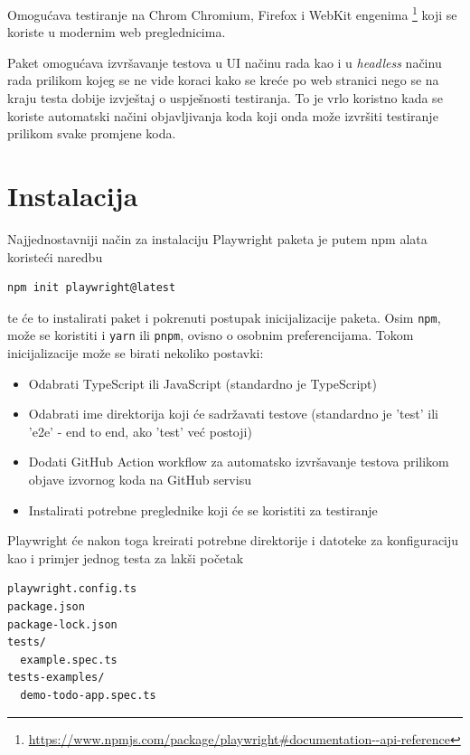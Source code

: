 Omogućava testiranje na Chrom Chromium, Firefox i WebKit engenima \footnote{\url{https://www.npmjs.com/package/playwright\#documentation--api-reference}} koji se koriste u modernim web preglednicima.

Paket omogućava izvršavanje testova u UI načinu rada kao i u \emph{headless} načinu rada prilikom kojeg se ne vide koraci kako se kreće po web stranici nego se na kraju testa dobije izvještaj o uspješnosti testiranja.
To je vrlo koristno kada se koriste automatski načini objavljivanja koda koji onda može izvršiti testiranje prilikom svake promjene koda.

\section{Instalacija}

Najjednostavniji način za instalaciju Playwright paketa je putem npm alata koristeći naredbu
\begin{verbatim}
npm init playwright@latest
\end{verbatim}
te će to instalirati paket i pokrenuti postupak inicijalizacije paketa.
Osim \texttt{npm}, može se koristiti i \texttt{yarn} ili \texttt{pnpm}, ovisno o osobnim preferencijama.
Tokom inicijalizacije može se birati nekoliko postavki:
\begin{itemize}
    \item Odabrati TypeScript ili JavaScript (standardno je TypeScript)
    \item Odabrati ime direktorija koji će sadržavati testove (standardno je 'test' ili 'e2e' - end to end, ako 'test' već postoji)
    \item Dodati GitHub Action workflow za automatsko izvršavanje testova prilikom objave izvornog koda na GitHub servisu
    \item Instalirati potrebne preglednike koji će se koristiti za testiranje
    
\end{itemize}

Playwright će nakon toga kreirati potrebne direktorije i datoteke za konfiguraciju kao i primjer jednog testa za lakši početak
\begin{verbatim}
playwright.config.ts
package.json
package-lock.json
tests/
  example.spec.ts
tests-examples/
  demo-todo-app.spec.ts
\end{verbatim}

